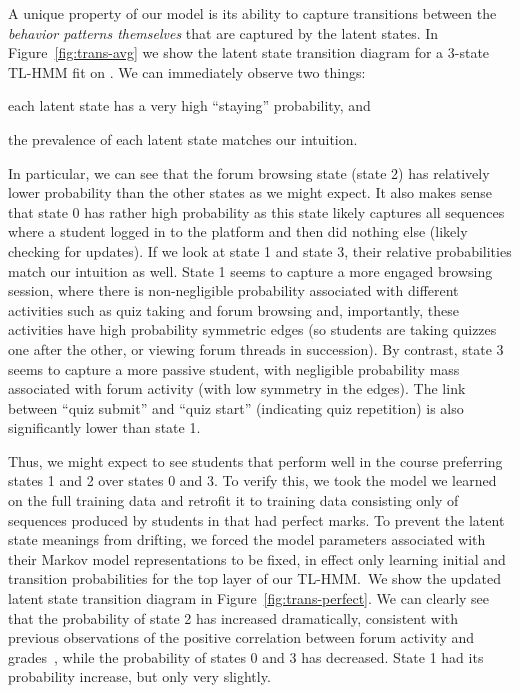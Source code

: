 A unique property of our model is its ability to capture transitions
between the \emph{behavior patterns themselves} that are captured by the
latent states. In Figure~\ref{fig:trans-avg} we show the latent state
transition diagram for a 3-state TL-HMM fit on \textretrieval{}. We can
immediately observe two things: \begin{enumerate*}[label=(\arabic*)]
  \item each latent state has a very high ``staying'' probability, and
  \item the prevalence of each latent state matches our intuition.
\end{enumerate*}
In particular, we can see that the forum browsing state (state 2) has
relatively lower probability than the other states as we might expect. It
also makes sense that state 0 has rather high probability as this state
likely captures all sequences where a student logged in to the platform and
then did nothing else (likely checking for updates). If we look at state 1
and state 3, their relative probabilities match our intuition as
well. State 1 seems to capture a more engaged browsing session, where there
is non-negligible probability associated with different activities such as
quiz taking and forum browsing and, importantly, these activities have high
probability symmetric edges (so students are taking quizzes one after the
other, or viewing forum threads in succession). By contrast, state 3 seems
to capture a more passive student, with negligible probability mass
associated with forum activity (with low symmetry in the edges). The link
between ``quiz submit'' and ``quiz start'' (indicating quiz repetition) is
also significantly lower than state 1.

Thus, we might expect to see students that perform well in the course
preferring states 1 and 2 over states 0 and 3. To verify this, we took the
model we learned on the full training data and retrofit it to training data
consisting only of sequences produced by students in \textretrieval{} that
had perfect marks. To prevent the latent state meanings from drifting, we
forced the model parameters associated with their Markov model
representations to be fixed, in effect only learning initial and transition
probabilities for the top layer of our TL-HMM.\ We show the updated latent
state transition diagram in Figure~\ref{fig:trans-perfect}. We can clearly
see that the probability of state 2 has increased dramatically, consistent
with previous observations of the positive correlation between forum activity and
grades~\cite{Huang:2014:LAS}, while the probability of states 0 and 3 has
decreased. State 1 had its probability increase, but only very slightly.

